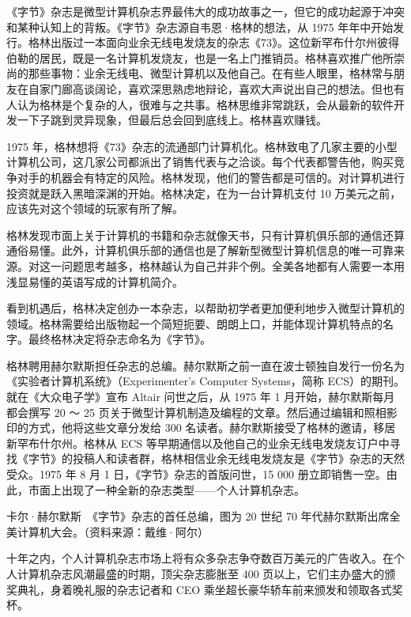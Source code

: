 \documentclass[12pt,UTF8]{ctexbook}
\begin{document}
《字节》杂志是微型计算机杂志界最伟大的成功故事之一，但它的成功起源于冲突和某种认知上的背叛。《字节》杂志源自韦恩·格林的想法，从 1975 年年中开始发行。格林出版过一本面向业余无线电发烧友的杂志《73》。这位新罕布什尔州彼得伯勒的居民，既是一名计算机发烧友，也是一名上门推销员。格林喜欢推广他所崇尚的那些事物：业余无线电、微型计算机以及他自己。在有些人眼里，格林常与朋友在自家门廊高谈阔论，喜欢深思熟虑地辩论，喜欢大声说出自己的想法。但也有人认为格林是个复杂的人，很难与之共事。格林思维非常跳跃，会从最新的软件开发一下子跳到灵异现象，但最后总会回到底线上。格林喜欢赚钱。

1975 年，格林想将《73》杂志的流通部门计算机化。格林致电了几家主要的小型计算机公司，这几家公司都派出了销售代表与之洽谈。每个代表都警告他，购买竞争对手的机器会有特定的风险。格林发现，他们的警告都是可信的。对计算机进行投资就是跃入黑暗深渊的开始。格林决定，在为一台计算机支付 10 万美元之前，应该先对这个领域的玩家有所了解。

格林发现市面上关于计算机的书籍和杂志就像天书，只有计算机俱乐部的通信还算通俗易懂。此外，计算机俱乐部的通信也是了解新型微型计算机信息的唯一可靠来源。对这一问题思考越多，格林越认为自己并非个例。全美各地都有人需要一本用浅显易懂的英语写成的计算机简介。

看到机遇后，格林决定创办一本杂志，以帮助初学者更加便利地步入微型计算机的领域。格林需要给出版物起一个简短扼要、朗朗上口，并能体现计算机特点的名字。最终格林决定将杂志命名为《字节》。

格林聘用赫尔默斯担任杂志的总编。赫尔默斯之前一直在波士顿独自发行一份名为《实验者计算机系统》（Experimenter's Computer Systems，简称 ECS）的期刊。就在《大众电子学》宣布 Altair 问世之后，从 1975 年 1 月开始，赫尔默斯每月都会撰写 20 ～ 25 页关于微型计算机制造及编程的文章。然后通过编辑和照相影印的方式，他将这些文章分发给 300 名读者。赫尔默斯接受了格林的邀请，移居新罕布什尔州。格林从 ECS 等早期通信以及他自己的业余无线电发烧友订户中寻找《字节》的投稿人和读者群，格林相信业余无线电发烧友是《字节》杂志的天然受众。1975 年 8 月 1 日，《字节》杂志的首版问世，15 000 册立即销售一空。由此，市面上出现了一种全新的杂志类型——个人计算机杂志。



卡尔·赫尔默斯　《字节》杂志的首任总编，图为 20 世纪 70 年代赫尔默斯出席全美计算机大会。（资料来源：戴维·阿尔）

十年之内，个人计算机杂志市场上将有众多杂志争夺数百万美元的广告收入。在个人计算机杂志风潮最盛的时期，顶尖杂志膨胀至 400 页以上，它们主办盛大的颁奖典礼，身着晚礼服的杂志记者和 CEO 乘坐超长豪华轿车前来颁发和领取各式奖杯。
\end{document}

